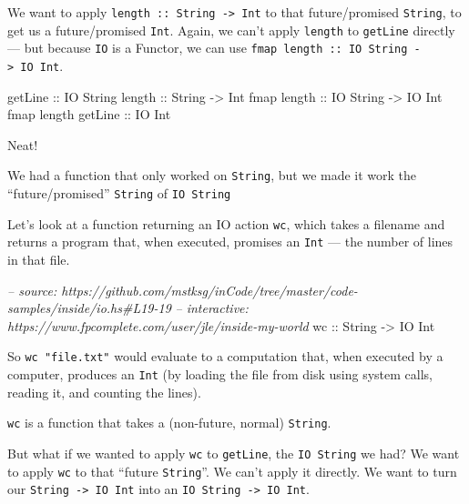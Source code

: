 \documentclass[]{article}
\newenvironment{Shaded}{\begin{snugshade}}{\end{snugshade}}
\newcommand{\CommentTok}[1]{\textcolor[rgb]{0.56,0.35,0.01}{\textit{#1}}}
\newcommand{\DataTypeTok}[1]{\textcolor[rgb]{0.13,0.29,0.53}{#1}}
\newcommand{\NormalTok}[1]{#1}
\newcommand{\OtherTok}[1]{\textcolor[rgb]{0.56,0.35,0.01}{#1}}
\begin{document}
We want to apply \texttt{length\ ::\ String\ -\textgreater{}\ Int} to that
future/promised \texttt{String}, to get us a future/promised \texttt{Int}.
Again, we can't apply \texttt{length} to \texttt{getLine} directly --- but
because \texttt{IO} is a Functor, we can use
\texttt{fmap\ length\ ::\ IO\ String\ -\textgreater{}\ IO\ Int}.

\begin{Shaded}
\begin{Highlighting}[]
\NormalTok{getLine}\OtherTok{             ::} \DataTypeTok{IO} \DataTypeTok{String}
\NormalTok{length}\OtherTok{              ::} \DataTypeTok{String} \OtherTok{->} \DataTypeTok{Int}
\NormalTok{fmap}\OtherTok{ length         ::} \DataTypeTok{IO} \DataTypeTok{String} \OtherTok{->} \DataTypeTok{IO} \DataTypeTok{Int}
\NormalTok{fmap length}\OtherTok{ getLine ::} \DataTypeTok{IO} \DataTypeTok{Int}
\end{Highlighting}
\end{Shaded}

Neat!

We had a function that only worked on \texttt{String}, but we made it work the
``future/promised'' \texttt{String} of \texttt{IO\ String}

Let's look at a function returning an IO action \texttt{wc}, which takes a
filename and returns a program that, when executed, promises an \texttt{Int} ---
the number of lines in that file.

\begin{Shaded}
\begin{Highlighting}[]
\CommentTok{-- source: https://github.com/mstksg/inCode/tree/master/code-samples/inside/io.hs#L19-19}
\CommentTok{-- interactive: https://www.fpcomplete.com/user/jle/inside-my-world}
\OtherTok{wc ::} \DataTypeTok{String} \OtherTok{->} \DataTypeTok{IO} \DataTypeTok{Int}
\end{Highlighting}
\end{Shaded}

So \texttt{wc\ "file.txt"} would evaluate to a computation that, when executed
by a computer, produces an \texttt{Int} (by loading the file from disk using
system calls, reading it, and counting the lines).

\texttt{wc} is a function that takes a (non-future, normal) \texttt{String}.

But what if we wanted to apply \texttt{wc} to \texttt{getLine}, the
\texttt{IO\ String} we had? We want to apply \texttt{wc} to that ``future
\texttt{String}''. We can't apply it directly. We want to turn our
\texttt{String\ -\textgreater{}\ IO\ Int} into an
\texttt{IO\ String\ -\textgreater{}\ IO\ Int}.
\end{document}

